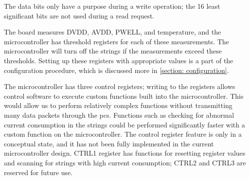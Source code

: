 \documentclass[main.tex]{subfiles}
\begin{document}
The data bits only have a purpose during a write operation; the 16 least significant bits are not used during a read request.

The board measures DVDD, AVDD, PWELL, and temperature, and the microcontroller has threshold registers for each of these measurements. The microcontroller will turn off the strings if the measurements exceed these thresholds. Setting up these registers with appropriate values is a part of the configuration procedure, which is discussed more in \autoref{section: configuration}.

The microcontroller has three control registers; writing to the registers allows control software to execute custom functions built into the microcontroller. This would allow us to perform relatively complex functions without transmitting many data packets through the \gls{pcs}. Functions such as checking for abnormal current consumption in the strings could be performed significantly faster with a custom function on the microcontroller. The control register feature is only in a conceptual state, and it has not been fully implemented in the current microcontroller design. CTRL1 register has functions for resetting register values and scanning for strings with high current consumption; CTRL2 and CTRL3 are reserved for future use.
\end{document}
